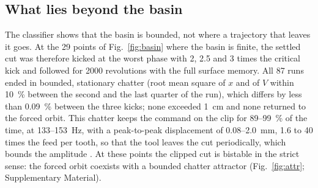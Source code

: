 \subsection{What lies beyond the basin}\label{sec:bistab-attr}

The classifier shows that the basin is bounded, not where a trajectory that leaves it goes. At the 29 points of Fig.~\ref{fig:basin} where the basin is finite, the settled cut was therefore kicked at the worst phase with 2, 2.5 and 3 times the critical kick and followed for 2000 revolutions with the full surface memory. All 87 runs ended in bounded, stationary chatter (root mean square of $x$ and of $V$ within \SI{10}{\percent} between the second and the last quarter of the run), which differs by less than \SI{0.09}{\percent} between the three kicks; none exceeded \SI{1}{\centi\metre} and none returned to the forced orbit. This chatter keeps the command on the clip for 89--\SI{99}{\percent} of the time, at 133--\SI{153}{\hertz}, with a peak-to-peak displacement of 0.08--\SI{2.0}{\milli\metre}, 1.6 to 40 times the feed per tooth, so that the tool leaves the cut periodically, which bounds the amplitude \citep{tlusty1981basic}. At these points the clipped cut is bistable in the strict sense: the forced orbit coexists with a bounded chatter attractor (Fig.~\ref{fig:attr}; Supplementary Material).

